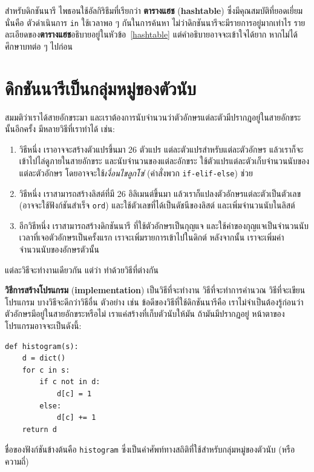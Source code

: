 สำหรับดิกชันนารี ไพธอนใช้อัลกิริธึมที่เรียกว่า \textbf{ตารางแฮช} (\textbf{hashtable}) ซึ่งมีคุณสมบัติที่ยอดเยี่ยม
นั่นคือ 
ตัวดำเนินการ \texttt{in} ใช้เวลาพอ ๆ กันในการค้นหา ไม่ว่าดิกชันนารีจะมีรายการอยู่มากเท่าไร
รายละเอียดของ\textbf{ตารางแฮช}อธิบายอยู่ในหัวข้อ~\ref{hashtable}
แต่คำอธิบายอาจจะเข้าใจได้ยาก หากไม่ได้ศึกษาบทต่อ ๆ ไปก่อน


\section{ดิกชันนารีเป็นกลุ่มหมู่ของตัวนับ}
\label{histogram}

สมมติว่าเราได้สายอักขระมา และเราต้องการนับจำนวนว่าตัวอักษรแต่ละตัวมีปรากฎอยู่ในสายอักขระนั้นอีกครั้ง
มีหลายวิธีที่เราทำได้ เช่น:

\begin{enumerate}

\item วิธีหนึ่ง เราอาจจะสร้างตัวแปรขึ้นมา 26 ตัวแปร แต่ละตัวแปรสำหรับแต่ละตัวอักษร
แล้วเราก็จะเข้าไปไล่ดูภายในสายอักขระ
และนับจำนวนของแต่ละอักขระ 
ใช้ตัวแปรแต่ละตัวเก็บจำนวนนับของแต่ละตัวอักษร
โดยอาจจะใช้\textit{เงื่อนไขลูกโซ่} (คำสั่งพวก \texttt{if-elif-else}) ช่วย

\item วิธีหนึ่ง เราสามารถสร้างลิสต์ที่มี 26 อิลิเมนต์ขึ้นมา
แล้วเราก็แปลงตัวอักษรแต่ละตัวเป็นตัวเลข (อาจจะใช้ฟังก์ชันสำเร็จ \texttt{ord}) และใช้ตัวเลขที่ได้เป็นดัชนีของลิสต์ 
และเพิ่มจำนวนนับในลิสต์

\item อีกวิธีหนึ่ง เราสามารถสร้างดิกชันนารี
ที่ใช้ตัวอักษรเป็นกุญแจ
และใช้ค่าของกุญแจเป็นจำนวนนับ
เวลาที่เจอตัวอักษรเป็นครั้งแรก เราจะเพิ่มรายการเข้าไปในดิกต์
หลังจากนั้น เราจะเพิ่มค่าจำนวนนับของอักษรตัวนั้น

\end{enumerate}

แต่ละวิธีจะทำงานเดียวกัน
แต่ว่า ทำด้วยวิธีที่ต่างกัน

\textbf{วิธีการสร้างโปรแกรม} (\textbf{implementation}) 
เป็นวิธีที่จะทำงาน วิธีที่จะทำการคำนวณ วิธีที่จะเขียนโปรแกรม
บางวิธีจะดีกว่าวิธีอื่น
ตัวอย่าง เช่น 
ข้อดีของวิธีที่ใช้ดิกชันนารีคือ
เราไม่จำเป็นต้องรู้ก่อนว่า ตัวอักษรมีอยู่ในสายอักขระหรือไม่
เราแค่สร้างที่เก็บตัวนับให้มัน ถ้ามันมีปรากฏอยู่
หน้าตาของโปรแกรมอาจจะเป็นดังนี้:

\begin{verbatim}
def histogram(s):
    d = dict()
    for c in s:
        if c not in d:
            d[c] = 1
        else:
            d[c] += 1
    return d
\end{verbatim}
%
ชื่อของฟังก์ชันข้างต้นคือ \texttt{histogram}
ซึ่งเป็นคำศัพท์ทางสถิติที่ใช้สำหรับกลุ่มหมู่ของตัวนับ (หรือ ความถี่)

